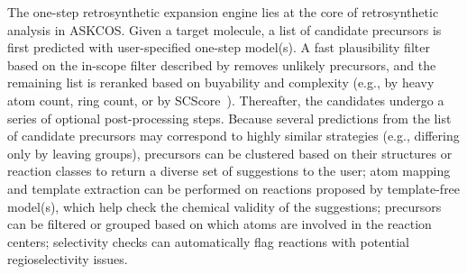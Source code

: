 \documentclass[pdflatex,sn-mathphys-num]{sn-jnl}%
\theoremstyle{thmstyleone}%
\theoremstyle{thmstyletwo}%
\theoremstyle{thmstylethree}%
\begin{document}
The one-step retrosynthetic expansion engine lies at the core of retrosynthetic analysis in ASKCOS. Given a target molecule, a list of candidate precursors is first predicted with user-specified one-step model(s). A fast plausibility filter based on the in-scope filter described by \citet{segler_planning_2018} removes unlikely precursors, and the remaining list is reranked based on buyability and complexity (e.g., by heavy atom count, ring count, or by SCScore~\citep{coley_scscore_2018}). Thereafter, the candidates undergo a series of optional post-processing steps. Because several predictions from the list of candidate precursors may correspond to highly similar strategies (e.g., differing only by leaving groups), precursors can be clustered based on their structures or reaction classes to return a diverse set of suggestions to the user; atom mapping and template extraction can be performed on reactions proposed by template-free model(s), which help check the chemical validity of the suggestions; precursors can be filtered or grouped based on which atoms are involved in the reaction centers; selectivity checks can automatically flag reactions with potential regioselectivity issues.
\end{document}
